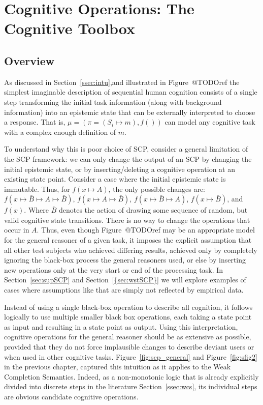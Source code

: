 \chapter{Cognitive Operations: The Cognitive Toolbox} \label{chp:toolbox}
\section{Overview}
As discussed in Section~\ref{ssec:intu},and illustrated in Figure~@TODOref the simplest imaginable description of sequential human cognition consists of a single step transforming the initial task information (along with background information) into an epistemic state that can be externally interpreted to choose a response. That is, $\mu=(\pi=(S_i \longmapsto m),f())$ can model any cognitive task with a complex enough definition of $m$.

To understand why this is poor choice of SCP, consider a general limitation of the SCP framework: we can only change the output of an SCP by changing the initial epistemic state, or by inserting/deleting a cognitive operation at an existing state point. Consider a case where the initial epistemic state is immutable. Thus, for $f(x \longmapsto A)$, the only possible changes are: $f(x \longmapsto \bar{B} \longmapsto A \longmapsto \bar{B})$, $f(x \longmapsto A \longmapsto \bar{B})$, $f(x \longmapsto \bar{B} \longmapsto A)$, $f(x \longmapsto \bar{B})$, and $f(x)$. Where $\bar{B}$ denotes the action of drawing some sequence of random, but valid cognitive state transitions. There is no way to change the operations that occur in $A$. Thus, even though Figure~@TODOref may be an appropriate model for the general reasoner of a given task, it imposes the explicit assumption that all other test subjects who achieved differing results, achieved only by completely ignoring the black-box process the general reasoners used, or else by inserting new operations only at the very start or end of the processing task. In Section~\ref{sec:supSCP} and Section~\ref{{sec:wstSCP}} we will explore examples of cases where assumptions like that are simply not reflected by empirical data. 

Instead of using a single black-box operation to describe all cognition, it follows logically to use multiple smaller black box operations, each taking a state point as input and resulting in a state point as output. Using this interpretation, cognitive operations for the general reasoner should be as extensive as possible, provided that they do not force implausible changes to describe deviant users or when used in other cognitive tasks. Figure~\ref{fig:scp_general} and Figure~\ref{fig:sfig2} in the previous chapter, captured this intuition as it applies to the Weak Completion Semantics. Indeed, as a non-monotonic logic that is already explicitly divided into discrete steps in the literature Section~\ref{ssec:wcs}, its individual steps are obvious candidate cognitive operations.


